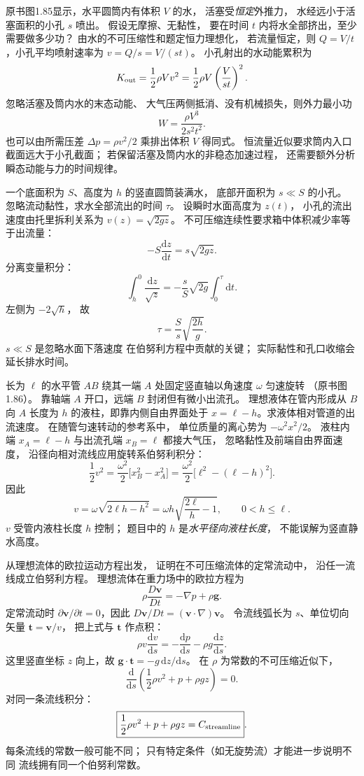 原书图1.85显示，水平圆筒内有体积 $V$ 的水，
活塞受\emph{恒定}外推力，
水经远小于活塞面积的小孔 $s$ 喷出。
假设无摩擦、无黏性，
要在时间 $t$ 内将水全部挤出，至少需要做多少功？
\exsolution
由水的不可压缩性和题定恒力理想化，
若流量恒定，则
$Q=V/t$，小孔平均喷射速率为
$v=Q/s=V/(st)$。
小孔射出的水动能累积为
\[
K_{\rm out}=
\frac12\rho V v^2
=\frac12\rho V\left(\frac{V}{st}\right)^2.
\]
忽略活塞及筒内水的末态动能、
大气压两侧抵消、没有机械损失，则外力最小功
\[
\boxed{W=\frac{\rho V^3}{2s^2t^2}}.
\]
也可以由所需压差
$\Delta p=\rho v^2/2$ 乘排出体积 $V$ 得同式。
\excheck 恒流量近似要求筒内入口截面远大于小孔截面；
若保留活塞及筒内水的非稳态加速过程，
还需要额外分析瞬态动能与力的时间规律。

一个底面积为 $S$、高度为 $h$ 的竖直圆筒装满水，
底部开面积为 $s\ll S$ 的小孔。
忽略流动黏性，求水全部流出的时间 $\tau$。
\exsolution
设瞬时水面高度为 $z(t)$，
小孔的流出速度由托里拆利关系为
$v(z)=\sqrt{2gz}$。
不可压缩连续性要求箱中体积减少率等于出流量：
\[
-S\frac{\mathrm dz}{\mathrm dt}
=s\sqrt{2gz}.
\]
分离变量积分：
\[
\int_h^0\frac{\mathrm dz}{\sqrt z}
=-\frac{s}{S}\sqrt{2g}\int_0^\tau\mathrm dt.
\]
左侧为 $-2\sqrt h$，
故
\[
\boxed{\tau=\frac{S}{s}\sqrt{\frac{2h}{g}}}.
\]
\excheck $s\ll S$ 是忽略水面下落速度
在伯努利方程中贡献的关键；
实际黏性和孔口收缩会延长排水时间。

长为 $\ell$ 的水平管 $AB$ 绕其一端 $A$
处固定竖直轴以角速度 $\omega$ 匀速旋转
（原书图1.86）。
靠轴端 $A$ 开口，远端 $B$ 封闭但有微小出流孔。
理想液体在管内形成从 $B$ 向 $A$
长度为 $h$ 的液柱，即靠内侧自由界面处于
$x=\ell-h$。求液体相对管道的出流速度。
\exsolution
在随管匀速转动的参考系中，
单位质量的离心势为 $-\omega^2x^2/2$。
液柱内端 $x_A=\ell-h$
与出流孔端 $x_B=\ell$ 都接大气压，
忽略黏性及前端自由界面速度，
沿径向相对流线应用旋转系伯努利积分：
\[
\frac12v^2
=\frac{\omega^2}{2}
\bigl[x_B^2-x_A^2\bigr]
=\frac{\omega^2}{2}\bigl[\ell^2-(\ell-h)^2\bigr].
\]
因此
\[
\boxed{v=\omega\sqrt{2\ell h-h^2}
=\omega h\sqrt{\frac{2\ell}{h}-1}},
\qquad 0<h\le\ell.
\]
\excheck $v$ 受管内液柱长度 $h$ 控制；
题目中的 $h$ 是\emph{水平径向液柱长度}，
不能误解为竖直静水高度。

从理想流体的欧拉运动方程出发，
证明在不可压缩流体的定常流动中，
沿任一流线成立伯努利方程。
\exsolution
理想流体在重力场中的欧拉方程为
\[
\rho\frac{D\bm v}{Dt}=-\nabla p+\rho\bm g.
\]
定常流动时
$\partial\bm v/\partial t=0$，因此
$D\bm v/Dt=(\bm v\cdot\nabla)\bm v$。
令流线弧长为 $s$、单位切向矢量
$\bm t=\bm v/v$，
把上式与 $\bm t$ 作点积：
\[
\rho v\frac{\mathrm dv}{\mathrm ds}
=-\frac{\mathrm dp}{\mathrm ds}
-\rho g\frac{\mathrm dz}{\mathrm ds}.
\]
这里竖直坐标 $z$ 向上，故
$\bm g\cdot\bm t=-g\,\mathrm dz/\mathrm ds$。
在 $\rho$ 为常数的不可压缩近似下，
\[
\frac{\mathrm d}{\mathrm ds}
\left(\frac12\rho v^2+p+\rho gz\right)=0.
\]
对同一条流线积分：
\[
\boxed{\frac12\rho v^2+p+\rho gz=C_{\rm streamline}}.
\]
\excheck 每条流线的常数一般可能不同；
只有特定条件（如无旋势流）才能进一步说明不同
流线拥有同一个伯努利常数。

